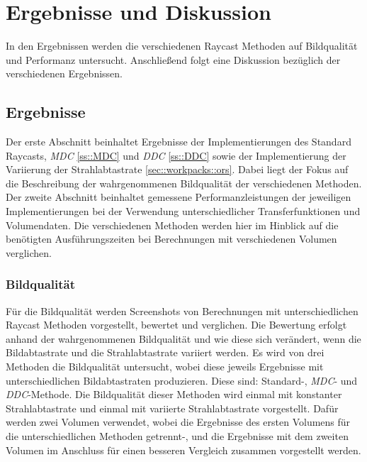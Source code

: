 \chapter{Ergebnisse und Diskussion}\label{chap::resdisc}
In den Ergebnissen werden die verschiedenen Raycast Methoden auf Bildqualität und Performanz untersucht.
Anschließend folgt eine Diskussion bezüglich der verschiedenen Ergebnissen.

\section{Ergebnisse}\label{sec::results}
Der erste Abschnitt beinhaltet Ergebnisse der Implementierungen des Standard Raycasts, \emph{MDC} \ref{ss::MDC} und \emph{DDC} \ref{ss::DDC} sowie der Implementierung der Variierung der Strahlabtastrate \ref{sec::workpacks::ors}.
Dabei liegt der Fokus auf die Beschreibung der wahrgenommenen Bildqualität der verschiedenen Methoden.
Der zweite Abschnitt beinhaltet gemessene Performanzleistungen der jeweiligen Implementierungen bei der Verwendung unterschiedlicher Transferfunktionen und Volumendaten.
Die verschiedenen Methoden werden hier im Hinblick auf die benötigten Ausführungszeiten bei Berechnungen mit verschiedenen Volumen verglichen.

\subsection{Bildqualität}
Für die Bildqualität werden Screenshots von Berechnungen mit unterschiedlichen Raycast Methoden vorgestellt, bewertet und verglichen.
Die Bewertung erfolgt anhand der wahrgenommenen Bildqualität und wie diese sich verändert, wenn die Bildabtastrate und die Strahlabtastrate variiert werden.
Es wird von drei Methoden die Bildqualität untersucht, wobei diese jeweils Ergebnisse mit unterschiedlichen Bildabtastraten produzieren.
Diese sind: Standard-, \emph{MDC}- und \emph{DDC}-Methode.
Die Bildqualität dieser Methoden wird einmal mit konstanter Strahlabtastrate und einmal mit variierte Strahlabtastrate vorgestellt.
Dafür werden zwei Volumen verwendet, wobei die Ergebnisse des ersten Volumens für die unterschiedlichen Methoden getrennt-, und die Ergebnisse mit dem zweiten Volumen im Anschluss für einen besseren Vergleich zusammen vorgestellt werden.


